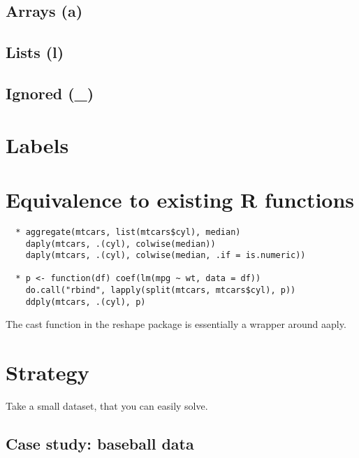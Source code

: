 \documentclass[letterpaper,oneside]{scrartcl}
\begin{document}
\subsection{Arrays (a)}
\subsection{Lists (l)}
\subsection{Ignored (\_)}

\section{Labels}


\section{Equivalence to existing R functions}

\begin{verbatim}
  * aggregate(mtcars, list(mtcars$cyl), median)
    daply(mtcars, .(cyl), colwise(median))
    daply(mtcars, .(cyl), colwise(median, .if = is.numeric))
    
  * p <- function(df) coef(lm(mpg ~ wt, data = df))
    do.call("rbind", lapply(split(mtcars, mtcars$cyl), p))
    ddply(mtcars, .(cyl), p)  
\end{verbatim}

The cast function in the reshape package is essentially a wrapper around aaply.

\section{Strategy}

Take a small dataset, that you can easily solve.  

\subsection{Case study: baseball data}
\end{document}
